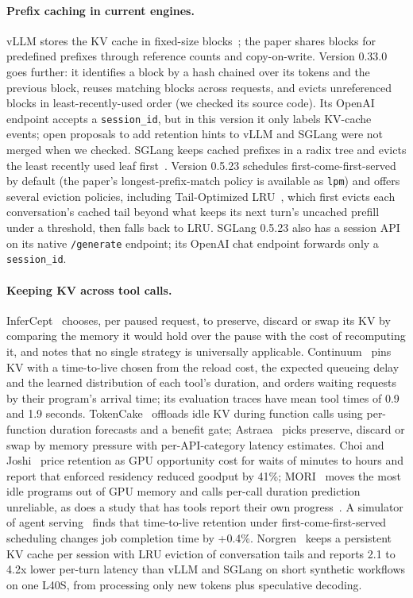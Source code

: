 \documentclass[11pt]{article}
\begin{document}
\paragraph{Prefix caching in current engines.} vLLM stores the KV cache in fixed-size blocks~\cite{vllm}; the paper shares blocks for predefined prefixes through reference counts and copy-on-write. Version 0.33.0 goes further: it identifies a block by a hash chained over its tokens and the previous block, reuses matching blocks across requests, and evicts unreferenced blocks in least-recently-used order (we checked its source code). Its OpenAI endpoint accepts a \texttt{session\_id}, but in this version it only labels KV-cache events; open proposals to add retention hints to vLLM and SGLang were not merged when we checked. SGLang keeps cached prefixes in a radix tree and evicts the least recently used leaf first~\cite{sglang}. Version 0.5.23 schedules first-come-first-served by default (the paper's longest-prefix-match policy is available as \texttt{lpm}) and offers several eviction policies, including Tail-Optimized LRU~\cite{tlru}, which first evicts each conversation's cached tail beyond what keeps its next turn's uncached prefill under a threshold, then falls back to LRU. SGLang 0.5.23 also has a session API on its native \texttt{/generate} endpoint; its OpenAI chat endpoint forwards only a \texttt{session\_id}.

\paragraph{Keeping KV across tool calls.} InferCept~\cite{infercept} chooses, per paused request, to preserve, discard or swap its KV by comparing the memory it would hold over the pause with the cost of recomputing it, and notes that no single strategy is universally applicable. Continuum~\cite{continuum} pins KV with a time-to-live chosen from the reload cost, the expected queueing delay and the learned distribution of each tool's duration, and orders waiting requests by their program's arrival time; its evaluation traces have mean tool times of 0.9 and 1.9 seconds. TokenCake~\cite{tokencake} offloads idle KV during function calls using per-function duration forecasts and a benefit gate; Astraea~\cite{astraea} picks preserve, discard or swap by memory pressure with per-API-category latency estimates. Choi and Joshi~\cite{choijoshi} price retention as GPU opportunity cost for waits of minutes to hours and report that enforced residency reduced goodput by 41\%; MORI~\cite{mori} moves the most idle programs out of GPU memory and calls per-call duration prediction unreliable, as does a study that has tools report their own progress~\cite{asktool}. A simulator of agent serving~\cite{agentservesim} finds that time-to-live retention under first-come-first-served scheduling changes job completion time by +0.4\%. Norgren~\cite{stateful} keeps a persistent KV cache per session with LRU eviction of conversation tails and reports 2.1 to 4.2x lower per-turn latency than vLLM and SGLang on short synthetic workflows on one L40S, from processing only new tokens plus speculative decoding.
\end{document}
